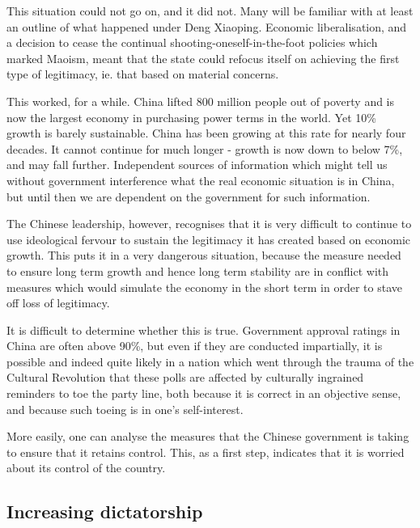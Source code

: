 \documentclass[11pt,a4paper]{report}
\newcounter{count}
\begin{document}
\begin{multicols}{2}
	
This situation could not go on, and it did not. Many will be familiar with at least an outline of what happened under Deng Xiaoping. Economic liberalisation, and a decision to cease the continual shooting-oneself-in-the-foot policies which marked Maoism, meant that the state could refocus itself on achieving the first type of legitimacy, ie. that based on material concerns.

This worked, for a while. China lifted 800 million people out of poverty and is now the largest economy in purchasing power terms in the world. Yet 10\% growth is barely sustainable. China has been growing at this rate for nearly four decades. It cannot continue for much longer - growth is now down to below 7\%, and may fall further. Independent sources of information which might tell us without government interference what the real economic situation is in China, but until then we are dependent on the government for such information.

The Chinese leadership, however, recognises that it is very difficult to continue to use ideological fervour to sustain the legitimacy it has created based on economic growth. This puts it in a very dangerous situation, because the measure needed to ensure long term growth and hence long term stability are in conflict with measures which would simulate the economy in the short term in order to stave off loss of legitimacy.

It is difficult to determine whether this is true. Government approval ratings in China are often above 90\%, but even if they are conducted impartially, it is possible and indeed quite likely in a nation which went through the trauma of the Cultural Revolution that these polls are affected by culturally ingrained reminders to toe the party line, both because it is correct in an objective sense, and because such toeing is in one's self-interest.

More easily, one can analyse the measures that the Chinese government is taking to ensure that it retains control. This, as a first step, indicates that it is worried about its control of the country.

\end{multicols}

\subsection{Increasing dictatorship}
\end{document}
